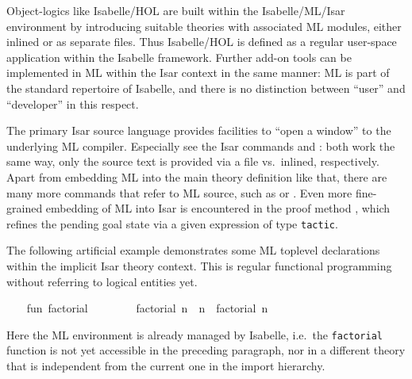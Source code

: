 \begin{isabellebody}
\begin{isamarkuptext}
  Object-logics like Isabelle/HOL are built within the
  Isabelle/ML/Isar environment by introducing suitable theories with
  associated ML modules, either inlined or as separate files.  Thus
  Isabelle/HOL is defined as a regular user-space application within
  the Isabelle framework.  Further add-on tools can be implemented in
  ML within the Isar context in the same manner: ML is part of the
  standard repertoire of Isabelle, and there is no distinction between
  ``user'' and ``developer'' in this respect.%
\end{isamarkuptext}%
\isamarkuptrue%
%
\isamarkuptrue%
%
\begin{isamarkuptext}%
The primary Isar source language provides facilities to ``open
  a window'' to the underlying ML compiler.  Especially see the Isar
  commands \hyperlink{command.use}{\mbox{}} and \hyperlink{command.ML}{\mbox{}}: both work the
  same way, only the source text is provided via a file vs.\ inlined,
  respectively.  Apart from embedding ML into the main theory
  definition like that, there are many more commands that refer to ML
  source, such as \hyperlink{command.setup}{\mbox{}} or \hyperlink{command.declaration}{\mbox{}}.
  Even more fine-grained embedding of ML into Isar is encountered in
  the proof method \hyperlink{method.tactic}{\mbox{}}, which refines the pending
  goal state via a given expression of type \verb|tactic|.%
\end{isamarkuptext}%
\isamarkuptrue%
%
\isadelimmlex
%
\endisadelimmlex
%
\isatagmlex
%
\begin{isamarkuptext}%
The following artificial example demonstrates some ML
  toplevel declarations within the implicit Isar theory context.  This
  is regular functional programming without referring to logical
  entities yet.%
\end{isamarkuptext}%
\isamarkuptrue%
%
\endisatagmlex
{\isafoldmlex}%
%
\isadelimmlex
%
\endisadelimmlex
%
\isadelimML
%
\endisadelimML
%
\isatagML
{}\isamarkupfalse%
\ {\isacharverbatimopen}\isanewline
\ \ fun\ factorial\ {}\ {\isacharequal}\ {}\isanewline
\ \ \ \ {\isacharbar}\ factorial\ n\ {\isacharequal}\ n\ {\isacharasterisk}\ factorial\ {\isacharparenleft}n\ {\isacharminus}\ {}{\isacharparenright}\isanewline
{\isacharverbatimclose}%
\endisatagML
{\isafoldML}%
%
\isadelimML
%
\endisadelimML
%
\begin{isamarkuptext}%
Here the ML environment is already managed by Isabelle, i.e.\
  the \verb|factorial| function is not yet accessible in the preceding
  paragraph, nor in a different theory that is independent from the
  current one in the import hierarchy.


\end{isamarkuptext}
\end{isabellebody}

